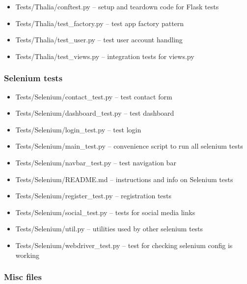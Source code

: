 \documentclass[main.tex]{subfiles}
\begin{document}
\begin{itemize}

\item
  Tests/Thalia/conftest.py -- setup and teardown code for Flask tests
\item
  Tests/Thalia/test\_factory.py -- test app factory pattern
\item
  Tests/Thalia/test\_user.py -- test user account handling
\item
  Tests/Thalia/test\_views.py -- integration tests for views.py
\end{itemize}

\subsubsection{Selenium tests}\label{selenium-tests}

\begin{itemize}

\item
  Tests/Selenium/contact\_test.py -- test contact form
\item
  Tests/Selenium/dashboard\_test.py -- test dashboard
\item
  Tests/Selenium/login\_test.py -- test login
\item
  Tests/Selenium/main\_test.py -- convenience script to run all selenium
  tests
\item
  Tests/Selenium/navbar\_test.py -- test navigation bar
\item
  Tests/Selenium/README.md -- instructions and info on Selenium tests
\item
  Tests/Selenium/register\_test.py -- registration tests
\item
  Tests/Selenium/social\_test.py -- tests for social media links
\item
  Tests/Selenium/util.py -- utilities used by other selenium tests
\item
  Tests/Selenium/webdriver\_test.py -- test for checking selenium config
  is working
\end{itemize}

\subsubsection{Misc files}\label{misc-files}
\end{document}
